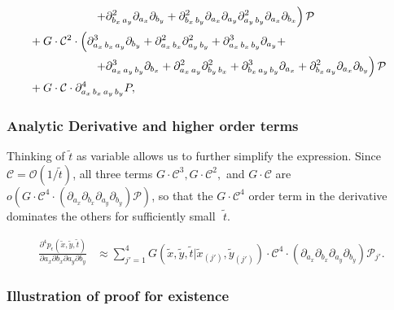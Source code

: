 \documentclass{beamer}
\begin{document}
\begin{frame}
\begin{align*}
  \MoveEqLeft[15] \left. \qquad\qquad\qquad +\partial^2_{b_x\, a_y} \partial_{a_x} \partial_{b_y} + \partial^2_{b_x\, b_y} \partial_{a_x} \partial_{a_y} \partial^2_{a_y\, b_y} \partial_{a_x} \partial_{b_x} \right) \mathcal{P} &  \nonumber \\
  \MoveEqLeft[15] \,\, + G \cdot \mathcal{C}^2 \cdot \left( \partial^3_{a_x\,b_x\,a_y} \partial_{b_y} + \partial^2_{a_x\,b_x}\partial^2_{a_y\,b_y} + \partial^3_{a_x\,b_x\,b_y}\partial_{a_y}  + \right.& \nonumber \\
  \MoveEqLeft[15] \left. \qquad\qquad\qquad + \partial^3_{a_x\,a_y\,b_y} \partial_{b_x} + \partial^2_{a_x\,a_y} \partial^2_{b_y\,b_x} + \partial^3_{b_x\,a_y\,b_y}\partial_{a_x} + \partial^2_{b_x\,a_y}\partial_{a_x}\partial_{b_y} \right) \mathcal{P} & \nonumber \\
  \MoveEqLeft[15] \,\, + G \cdot \mathcal{C} \cdot \partial^4_{a_x\,b_x\,a_y\,b_y} P,& \label{eq:fourth-deriv}
\end{align*}
\end{frame}
\begin{frame}
  \frametitle{Analytic Derivative and higher order terms}

  Thinking of $\tilde{t}$ as variable allows us to further simplify
  the expression. Since $\mathcal{C} = \mathcal{O}(1/\tilde{t})$, all
  three terms $G\cdot \mathcal{C}^3, G\cdot \mathcal{C}^2,$ and
  $G\cdot \mathcal{C}$ are
  $o\left( G\cdot \mathcal{C}^4 \cdot
    \left(\partial_{a_x}\partial_{b_x} \partial_{a_y}\partial_{b_y}
    \right)\mathcal{P} \right)$, so that the $G\cdot \mathcal{C}^4$
  order term in the derivative dominates the others for sufficiently
  small $\,\,\tilde{t}$.

  \begin{align*}
  \frac{\partial^4 p_\epsilon(\tilde{x}, \tilde{y}, \tilde{t})}{\partial a_x
  \partial b_x \partial a_y \partial b_y} &\approx \sum_{j'=1}^{4} G(\tilde{x},\tilde{y},\tilde{t}|\tilde{x}_{(j')},\tilde{y}_{(j')}) \cdot \mathcal{C}^4 \cdot \left(\partial_{a_x}\partial_{b_x} \partial_{a_y}\partial_{b_y} \right)\mathcal{P}_{j'}. 
\end{align*}
\end{frame}
\begin{frame}
  \frametitle{Illustration of proof for existence}
\end{frame}
\end{document}
